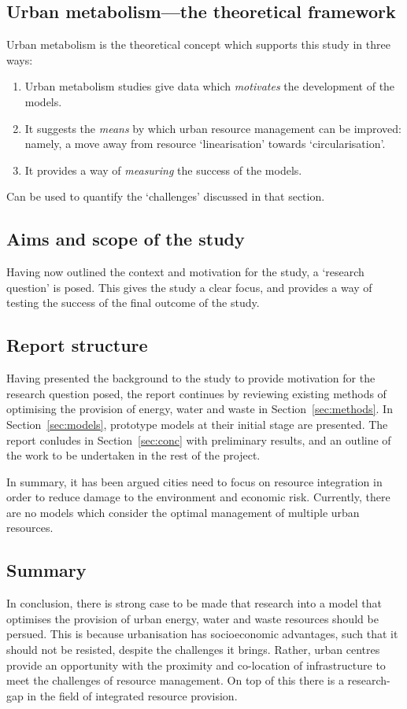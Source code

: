 \subsection{Urban metabolism---the theoretical framework}
Urban metabolism is the theoretical concept which supports this study in three ways:
\begin{enumerate}
	\item Urban metabolism studies give data which \emph{motivates} the development of the models.
	\item It suggests the \emph{means} by which urban resource management can be improved: namely, a move away from resource `linearisation' towards `circularisation'.
\item It provides a way of \emph{measuring} the success of the models.
\end{enumerate}
Can be used to quantify the `challenges' discussed in that section.


\subsection{Aims and scope of the study}
Having now outlined the context and motivation for the study, a `research question' is posed. This gives the study a clear focus, and provides a way of testing the success of the final outcome of the study.


\subsection{Report structure}
Having presented the background to the study to provide motivation for the research question posed, the report continues by reviewing existing methods of optimising the provision of energy, water and waste in Section~\ref{sec:methods}. In Section~\ref{sec:models}, prototype models at their initial stage are presented. The report conludes in Section~\ref{sec:conc} with preliminary results, and an outline of the work to be undertaken in the rest of the project.

In summary, it has been argued cities need to focus on resource integration in order to reduce damage to the environment and economic risk. Currently, there are no models which consider the optimal management of multiple urban resources.

\subsection{Summary}
In conclusion, there is strong case to be made that research into a model that optimises the provision of urban energy, water and waste resources should be persued. This is because urbanisation has socioeconomic advantages, such that it should not be resisted, despite the challenges it brings. Rather, urban centres provide an opportunity with the proximity and co-location of infrastructure to meet the challenges of resource management. On top of this there is a research-gap in the field of integrated resource provision.

